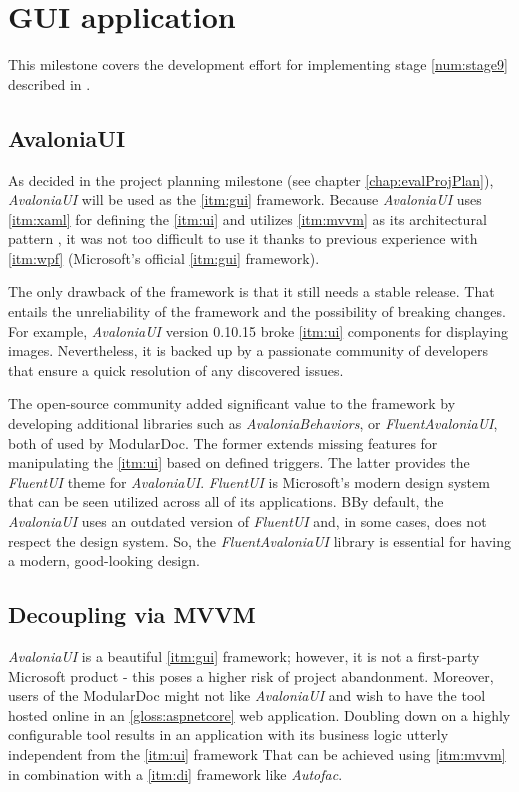 \chapter{GUI application}

This milestone covers the development effort for implementing stage \ref{num:stage9} described in .

\section{AvaloniaUI}

As decided in the project planning milestone (see chapter \ref{chap:evalProjPlan}), \textit{AvaloniaUI} will be used as the \ref{itm:gui} framework.
Because \textit{AvaloniaUI} uses \ref{itm:xaml} for defining the \ref{itm:ui} and utilizes \ref{itm:mvvm} as its architectural pattern \cite{katz_mvvm_2022}, it was not too difficult to use it thanks to previous experience with \ref{itm:wpf} (Microsoft's official \ref{itm:gui} framework).

The only drawback of the framework is that it still needs a stable release. That entails the unreliability of the framework and the possibility of breaking changes. For example, \textit{AvaloniaUI} version 0.10.15 broke \ref{itm:ui} components for displaying images. Nevertheless, it is backed up by a passionate community of developers that ensure a quick resolution of any discovered issues.

The open-source community added significant value to the framework by developing additional libraries such as \textit{AvaloniaBehaviors}, or \textit{FluentAvaloniaUI}, both of used by ModularDoc. The former extends missing features for manipulating the \ref{itm:ui} based on defined triggers. The latter provides the \textit{FluentUI} theme for \textit{AvaloniaUI}. \textit{FluentUI} is Microsoft's modern design system that can be seen utilized across all of its applications. BBy default, the \textit{AvaloniaUI} uses an outdated version of \textit{FluentUI} and, in some cases, does not respect the design system. So, the \textit{FluentAvaloniaUI} library is essential for having a modern, good-looking design.

\section{Decoupling via MVVM}

\textit{AvaloniaUI} is a beautiful \ref{itm:gui} framework; however, it is not a first-party Microsoft product - this poses a higher risk of project abandonment. Moreover, users of the ModularDoc might not like \textit{AvaloniaUI} and wish to have the tool hosted online in an \ref{gloss:aspnetcore} web application. Doubling down on a highly configurable tool results in an application with its business logic utterly independent from the \ref{itm:ui} framework
That can be achieved using \ref{itm:mvvm} in combination with a \ref{itm:di} framework like \textit{Autofac}.

